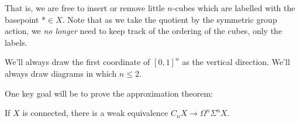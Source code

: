 \documentclass[11pt]{article}
\newcommand{\labsq}[6][0]{
\draw (#2+#1,#3)--(#4+#1,#3)--(#4+#1,#5)--(#2+#1,#5)-- cycle;
\path (.5*#2+.5*#4+#1,.5*#3+.5*#5) node[font=\scriptsize] {#6};
}
\begin{document}
\begin{chapter4-6}
\begin{center}
\end{center}
That is, we are free to insert or remove little $n$-cubes which are labelled with the basepoint $*\in X$. Note that as we take the quotient by the symmetric group action, we \emph{no longer} need to keep track of the ordering of the cubes, only the labels.
\begin{rmk*}
We'll always draw the first coordinate of $[0,1]^n$ as the vertical direction. We'll always draw diagrams in which $n\leq2$.
\end{rmk*}
One key goal will be to prove the approximation theorem:
\begin{thm*}[2.7 --- Approximation]
If $X$ is connected, there is a weak equivalence $C_nX\to\Omega^n\Sigma^nX$.
\end{thm*}



\end{chapter4-6}
\end{document}
